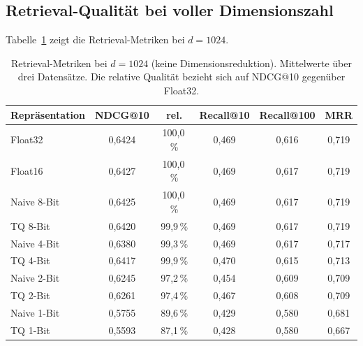 \subsection{Retrieval-Qualität bei voller Dimensionszahl}
\label{sec:ergebnisse_phase4_fulldim}
%
Tabelle~\ref{tab:phase4_fulldim} zeigt die Retrieval-Metriken bei $d = 1024$.
%
\begin{table}[htbp]
  \centering
  \caption[Retrieval-Metriken bei voller Dimensionszahl]{Retrieval-Metriken bei $d = 1024$ (keine Dimensionsreduktion). Mittelwerte über drei Datensätze. Die relative Qualität bezieht sich auf NDCG@10 gegenüber Float32.}
  \label{tab:phase4_fulldim}
  \begin{tabular}{lccccc}
    \toprule
    Repräsentation & NDCG@10 & rel. & Recall@10 & Recall@100 & MRR \\
    \midrule
    Float32         & 0{,}6424 & 100{,}0\,\% & 0{,}469 & 0{,}616 & 0{,}719 \\
    Float16         & 0{,}6427 & 100{,}0\,\% & 0{,}469 & 0{,}617 & 0{,}719 \\
    Naive 8-Bit     & 0{,}6425 & 100{,}0\,\% & 0{,}469 & 0{,}617 & 0{,}719 \\
    TQ 8-Bit        & 0{,}6420 &  99{,}9\,\% & 0{,}469 & 0{,}617 & 0{,}719 \\
    Naive 4-Bit     & 0{,}6380 &  99{,}3\,\% & 0{,}469 & 0{,}617 & 0{,}717 \\
    TQ 4-Bit        & 0{,}6417 &  99{,}9\,\% & 0{,}470 & 0{,}615 & 0{,}713 \\
    Naive 2-Bit     & 0{,}6245 &  97{,}2\,\% & 0{,}454 & 0{,}609 & 0{,}709 \\
    TQ 2-Bit        & 0{,}6261 &  97{,}4\,\% & 0{,}467 & 0{,}608 & 0{,}709 \\
    Naive 1-Bit     & 0{,}5755 &  89{,}6\,\% & 0{,}429 & 0{,}580 & 0{,}681 \\
    TQ 1-Bit        & 0{,}5593 &  87{,}1\,\% & 0{,}428 & 0{,}580 & 0{,}667 \\
    \bottomrule
  \end{tabular}
\end{table}
%
